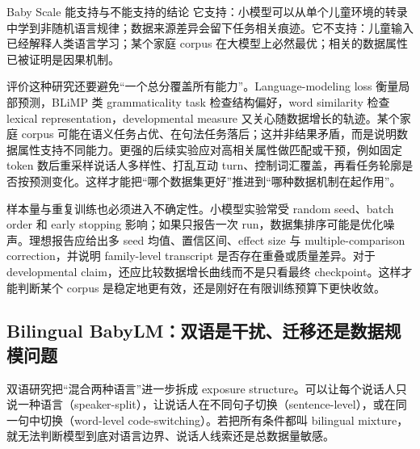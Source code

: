


\begin{importantbox}{Baby Scale 能支持与不能支持的结论}
它支持：小模型可以从单个儿童环境的转录中学到非随机语言规律；数据来源差异会留下任务相关痕迹。它不支持：儿童输入已经解释人类语言学习；某个家庭 corpus 在大模型上必然最优；相关的数据属性已被证明是因果机制。
\end{importantbox}

评价这种研究还要避免“一个总分覆盖所有能力”。Language-modeling loss 衡量局部预测，BLiMP 类 grammaticality task 检查结构偏好，word similarity 检查 lexical representation，developmental measure 又关心随数据增长的轨迹。某个家庭 corpus 可能在语义任务占优、在句法任务落后；这并非结果矛盾，而是说明数据属性支持不同能力。更强的后续实验应对高相关属性做匹配或干预，例如固定 token 数后重采样说话人多样性、打乱互动 turn、控制词汇覆盖，再看任务轮廓是否按预测变化。这样才能把“哪个数据集更好”推进到“哪种数据机制在起作用”。

样本量与重复训练也必须进入不确定性。小模型实验常受 random seed、batch order 和 early stopping 影响；如果只报告一次 run，数据集排序可能是优化噪声。理想报告应给出多 seed 均值、置信区间、effect size 与 multiple-comparison correction，并说明 family-level transcript 是否存在重叠或质量差异。对于 developmental claim，还应比较数据增长曲线而不是只看最终 checkpoint。这样才能判断某个 corpus 是稳定地更有效，还是刚好在有限训练预算下更快收敛。

\subsection{Bilingual BabyLM：双语是干扰、迁移还是数据规模问题}

双语研究把“混合两种语言”进一步拆成 exposure structure。可以让每个说话人只说一种语言（speaker-split），让说话人在不同句子切换（sentence-level），或在同一句中切换（word-level code-switching）。若把所有条件都叫 bilingual mixture，就无法判断模型到底对语言边界、说话人线索还是总数据量敏感。


